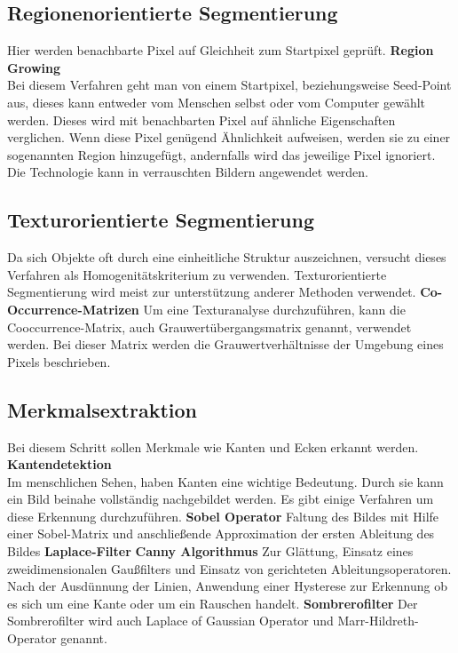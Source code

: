     \subsection*{Regionenorientierte Segmentierung} 
    Hier werden benachbarte Pixel auf Gleichheit zum Startpixel geprüft. \cite{Seg_region}
    \textbf{Region Growing}\\ 
    Bei diesem Verfahren geht man von einem Startpixel, beziehungsweise Seed-Point aus, dieses kann entweder vom Menschen selbst oder vom Computer gewählt werden. Dieses wird mit benachbarten Pixel auf ähnliche Eigenschaften verglichen. Wenn diese Pixel genügend Ähnlichkeit aufweisen, werden sie zu einer sogenannten Region hinzugefügt, andernfalls wird das jeweilige Pixel ignoriert. Die Technologie kann in verrauschten Bildern angewendet werden.

    \subsection*{Texturorientierte Segmentierung} 
    Da sich Objekte oft durch eine einheitliche Struktur auszeichnen, versucht dieses Verfahren als Homogenitätskriterium zu verwenden. Texturorientierte Segmentierung wird meist zur unterstützung anderer Methoden verwendet. \cite{Seg_textur}
    \textbf{Co-Occurrence-Matrizen}
    Um eine Texturanalyse durchzuführen, kann die Cooccurrence-Matrix, auch Grauwertübergangsmatrix genannt, verwendet werden. \cite{seg_coocc}
    Bei dieser Matrix werden die Grauwertverhältnisse der Umgebung eines Pixels beschrieben.

    \subsection*{Merkmalsextraktion}
    Bei diesem Schritt sollen Merkmale wie Kanten und Ecken erkannt werden.
    \textbf{Kantendetektion}\\
    Im menschlichen Sehen, haben Kanten eine wichtige Bedeutung. Durch sie kann ein Bild beinahe vollständig nachgebildet werden. Es gibt einige Verfahren um diese Erkennung durchzuführen.
    \textbf{Sobel Operator} Faltung des Bildes mit Hilfe einer Sobel-Matrix und anschließende Approximation der ersten Ableitung des Bildes
    \textbf{Laplace-Filter}
    \textbf{Canny Algorithmus} Zur Glättung, Einsatz eines zweidimensionalen Gaußfilters und Einsatz von gerichteten Ableitungsoperatoren. Nach der Ausdünnung der Linien, Anwendung einer Hysterese zur Erkennung ob es sich um eine Kante oder um ein Rauschen handelt.
    \textbf{Sombrerofilter} Der Sombrerofilter wird auch Laplace of Gaussian Operator und Marr-Hildreth-Operator genannt.

